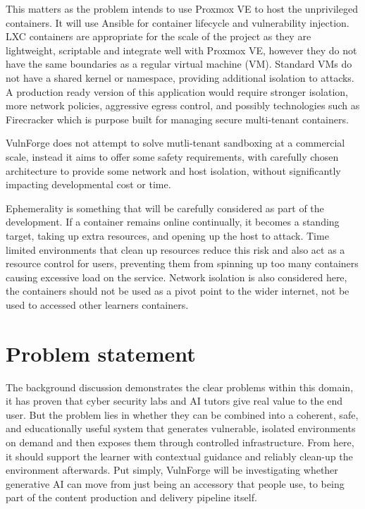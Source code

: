 This matters as the problem intends to use Proxmox VE to host the unprivileged containers. It will use Ansible for container lifecycle and vulnerability injection. LXC containers are appropriate for the scale of the project as they are lightweight, scriptable and integrate well with Proxmox VE, however they do not have the same boundaries as a regular virtual machine (VM). Standard VMs do not have a shared kernel or namespace, providing additional isolation to attacks. A production ready version of this application would require stronger isolation, more network policies, aggressive egress control, and possibly technologies such as Firecracker\cite{noauthor_firecracker_nodate} which is purpose built for managing secure multi-tenant containers.

VulnForge does not attempt to solve mutli-tenant sandboxing at a commercial scale, instead it aims to offer some safety requirements, with carefully chosen architecture to provide some network and host isolation, without significantly impacting developmental cost or time. 

Ephemerality is something that will be carefully considered as part of the development. If a container remains online continually, it becomes a standing target, taking up extra resources, and opening up the host to attack. Time limited environments that clean up resources reduce this risk and also act as a resource control for users, preventing them from spinning up too many containers causing excessive load on the service. Network isolation is also considered here, the containers should not be used as a pivot point to the wider internet, not be used to accessed other learners containers. 

\section{Problem statement}\label{sec:problem}

The background discussion demonstrates the clear problems within this domain, it has proven that cyber security labs and AI tutors give real value to the end user. But the problem lies in whether they can be combined into a coherent, safe, and educationally useful system that generates vulnerable, isolated environments on demand and then exposes them through controlled infrastructure. From here, it should support the learner with contextual guidance and reliably clean-up the environment afterwards. Put simply, VulnForge will be investigating whether generative AI can move from just being an accessory that people use, to being part of the content production and delivery pipeline itself. 

